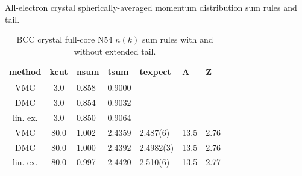 \documentclass[aps,prl,superscriptaddress]{revtex4-1}
\newcommand{\midrule}{\hline}
\newcommand{\bottomrule}{\hline\hline}
\begin{document}
\begin{table}[h]
\caption{All-electron crystal spherically-averaged momentum distribution sum rules and tail. \label{tab:fc-ntsum}}
\begin{subtable}{0.49\textwidth}
\caption{BCC crystal full-core N54 $n(k)$ sum rules with and without extended tail.\label{tab:solid-bare-n54-sum02}}
\begin{tabular}{cclllll}
\toprule
method & kcut & nsum & tsum & texpect & A & Z \\
\midrule
VMC & 3.0 & 0.858 & 0.9000 \\
DMC & 3.0 & 0.854 & 0.9032 \\
lin. ex. & 3.0 & 0.850 & 0.9064 \\
VMC & 80.0 & 1.002 & 2.4359 & 2.487(6) & 13.5 & 2.76 \\
DMC & 80.0 & 1.000 & 2.4392 & 2.4982(3) & 13.5 & 2.76 \\
lin. ex. & 80.0 & 0.997 & 2.4420 & 2.510(6) & 13.5 & 2.77 \\
\bottomrule
\end{tabular}
\end{subtable}
\end{table}

%
%
\end{document}
